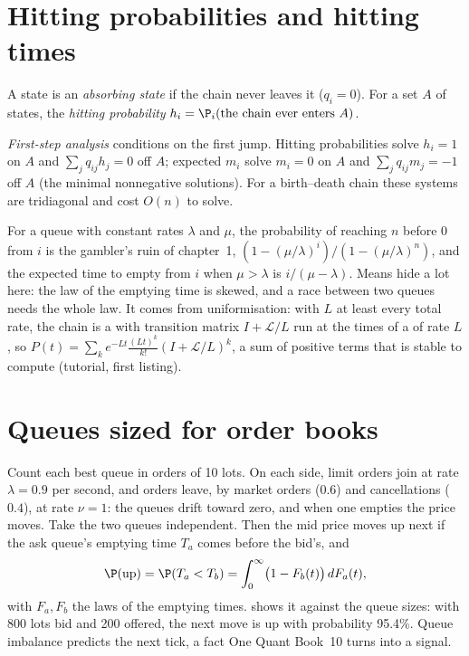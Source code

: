 \section{Hitting probabilities and hitting times}

\begin{definition}\label{def:qm:markov-chains-and-queues:hitting}
A state is an \emph{absorbing state} if the chain never leaves it ($q_i = 0$). For a set $A$ of
states, the \emph{hitting probability} $h_i = \P_i(\text{the chain ever enters } A)$.
\end{definition}

\begin{method}\label{met:qm:markov-chains-and-queues:firststep}
\emph{First-step analysis} conditions on the first jump. Hitting probabilities solve
$h_i = 1$ on $A$ and $\sum_jq_{ij}h_j = 0$ off $A$; expected  $m_i$ solve $m_i = 0$ on $A$ and $\sum_jq_{ij}m_j =
-1$ off $A$ (the minimal nonnegative solutions). For a birth--death chain these systems are tridiagonal and
cost $O(n)$ to solve.
\end{method}

For a queue with constant rates $\lambda$ and $\mu$, the probability of reaching $n$ before 0 from $i$ is the
gambler's ruin of chapter~1, $(1 - (\mu/\lambda)^i)/(1 - (\mu/\lambda)^n)$, and the expected time to empty from $i$ when $\mu > \lambda$
is $i/(\mu - \lambda)$. Means hide a lot here: the law of the emptying time is skewed, and a race between two
queues needs the whole law. It comes from uniformisation: with $L$ at least every total rate, the chain
is a  with transition matrix $I + \mathcal L/L$ run at the times of a  of rate $L$, so
$P(t) = \sum_k e^{-Lt}\frac{(Lt)^k}{k!}(I + \mathcal L/L)^k$, a sum of positive terms that is stable to compute
(tutorial, first listing).

\section{Queues sized for order books}

Count each best queue in orders of 10 lots. On each side, limit orders join at rate $\lambda = 0.9$ per second, and
orders leave, by market orders ($0.6$) and cancellations ($0.4$), at rate $\nu = 1$: the queues drift toward
zero, and when one empties the price moves. Take the two queues independent. Then the mid price moves up
next if the ask queue's emptying time $T_a$ comes before the bid's, and
\[
\P(\text{up}) = \P(T_a < T_b) = \int_0^\infty\bigl(1 - F_b(t)\bigr)\,dF_a(t),
\]
with $F_a, F_b$ the laws of the emptying times.  shows it against
the queue sizes: with 800 lots bid and 200 offered, the next move is up with probability 95.4\%. Queue
imbalance predicts the next tick, a fact One Quant Book~10 turns into a signal.

